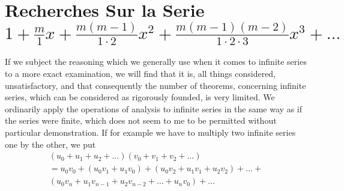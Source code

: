 \section{Recherches Sur la Serie $1 + \frac{m}{1}x + \frac{m(m-1)}{1\cdot2}x^2 + \frac{m(m-1)(m-2)}{1\cdot 2 \cdot 3}x^3 + \ldots$}


If we subject the reasoning which we generally use when it comes to infinite series
to a more exact examination, we will find that it is, all things considered, unsatisfactory,
and that consequently the number of theorems, concerning infinite series, which can be
considered as rigorously founded, is very limited.
We ordinarily apply the operations of analysis to infinite series in the same way as if the
series were finite, which does not seem to me to be permitted without particular
demonstration.
If for example we have to multiply two infinite series one by the other, we put
\begin{align*}
\left( u_0 + u_1 + u_2 + \ldots \right) \left( v_0 + v_1 + v_2 + \ldots \right) \\
= u_0 v_0 + (u_0 v_1 + u_1 v_0) + ( u_0 v_2 + u_1 v_1 + u_2 v_2 ) + \ldots + \\
    (u_0 v_n + u_1 v_{n-1} + u_2 v_{n-2} + \ldots + u_n v_0 ) + \ldots
\end{align*}